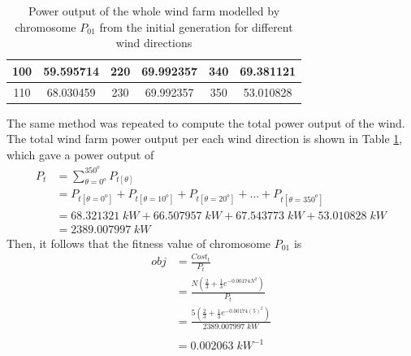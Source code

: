 \begin{table}[]
\begin{tabular}{|cc|cc|cc|}
        100                     & 59.595714            & 220                     & 69.992357            & 340                     & 69.381121            \\ \hline
        110                     & 68.030459            & 230                     & 69.992357            & 350                     & 53.010828            \\ \hline
        \end{tabular}
        \caption{Power output of the whole wind farm modelled by chromosome $P_{01}$ from the initial generation for different wind directions}
        \label{powerOut}
    \end{table}
    
    The same method was repeated to compute the total power output of the wind. The total wind farm power output per each wind direction is shown in Table \ref{powerOut}, which gave a power output of
    \begin{align*}
        P_t
        &= \sum_{\theta=0^o}^{350^o} P_{t[\theta]} \\
        &= P_{t[\theta=0^o]}+P_{t[\theta=10^o]}+P_{t[\theta=20^o]}+...+P_{t[\theta=350^o]} \\
        &= 68.321321\;kW+66.507957\;kW+67.543773\;kW+53.010828\;kW \\
        &= 2389.007997\;kW
    \end{align*}
    Then, it follows that the fitness value of chromosome $P_{01}$ is
    \begin{align*}
        obj
        &= \frac{Cost_t}{P_t} \\
        &= \frac{N\left(\frac{2}{3}+\frac{1}{3}e^{-0.00174N^2}\right)}{P_t} \\
        &= \frac{5\left(\frac{2}{3}+\frac{1}{3}e^{-0.00174(5)^2}\right)}{2389.007997\;kW} \\ \\
        &= 0.002063\; kW^{-1}
    \end{align*}

